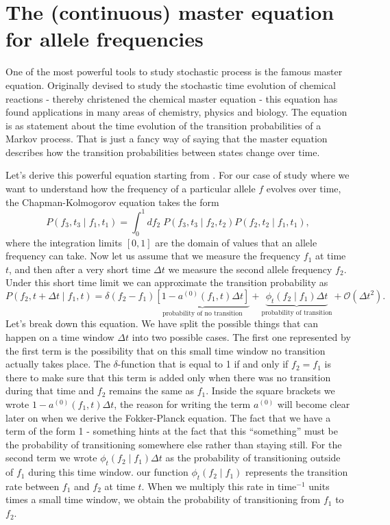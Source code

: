 \section{The (continuous) master equation for allele frequencies}

One of the most powerful tools to study stochastic process is the famous master
equation. Originally devised to study the stochastic time evolution of chemical
reactions - thereby christened the chemical master equation - this equation has
found applications in many areas of chemistry, physics and biology. The equation
is as statement about the time evolution of the transition probabilities of a
Markov process. That is just a fancy way of saying that the master equation
describes how the transition probabilities between states change over time.

Let's derive this powerful equation starting from .
For our case of study where we want to understand how the frequency of a
particular allele $f$ evolves over time, the Chapman-Kolmogorov equation takes
the form
\begin{equation}
  P(f_3, t_3 \mid f_1, t_1) = \int_0^1 df_2\; P(f_3, t_3 \mid f_2, t_2)
                                          P(f_2, t_2 \mid f_1, t_1),
\end{equation}
where the integration limits $[0, 1]$ are the domain of values that an allele
frequency can take. Now let us assume that we measure the frequency $f_1$ at
time $t$, and then after a very short time $\Delta t$ we measure the second
allele frequency $f_2$. Under this short time limit we can approximate the
transition probability as
\begin{equation}
  P(f_2, t + \Delta t \mid f_1, t) = \delta(f_2 - f_1)
  \underbrace{\left[ 1 - a^{(0)}(f_1, t) \Delta t \right]}_{\text{probability
  of no transition}} +
  \underbrace{\phi_t(f_2 \mid f_1)\Delta t}_\text{probability of transition} +
  \mathcal{O}(\Delta t^2).
  \label{eq_transition_short_time}
\end{equation}
Let's break down this equation. We have split the possible things that can
happen on a time window $\Delta t$ into two possible cases. The first one
represented by the first term is the possibility that on this small time window
no transition actually takes place. The $\delta$-function that is equal to 1 if
and only if $f_2 = f_1$ is there to make sure that this term is added only when
there was no transition during that time and $f_2$ remains the same as $f_1$.
Inside the square brackets we wrote $1 - a^{(0)}(f_1, t) \Delta t$, the reason
for writing the term $a^{(0)}$ will become clear later on when we derive the
Fokker-Planck equation. The fact that we have a term of the form 1 - something
hints at the fact that this ``something'' must be the probability of
transitioning somewhere else rather than staying still. For the second term
we wrote $\phi_t(f_2 \mid f_1)\Delta t$ as the probability of transitioning
outside of $f_1$ during this time window. our function $\phi_t(f_2 \mid f_1)$
represents the transition rate between $f_1$ and $f_2$ at time $t$. When we
multiply this rate in time$^{-1}$ units times a small time window, we obtain the
probability of transitioning from $f_1$ to $f_2$.

